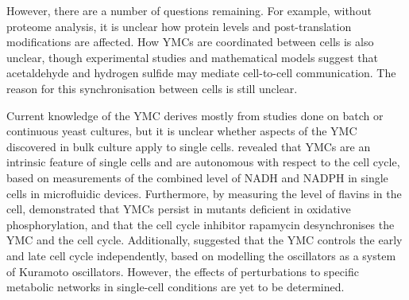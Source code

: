 However, there are a number of questions remaining.
For example, without proteome analysis, it is unclear how protein levels and post-translation modifications are affected.
How YMCs are coordinated between cells is also unclear, though experimental studies \citep{murrayRegulationYeastOscillatory2007} and mathematical models
\citep{krishnaMinimalPushPull2018} suggest that acetaldehyde and hydrogen sulfide may mediate cell-to-cell communication.
The reason for this synchronisation between cells is still unclear. %

Current knowledge of the YMC derives mostly from studies done on batch or continuous yeast cultures, but it is unclear whether aspects of the YMC discovered in bulk culture apply to single cells.
\citet{papagiannakisAutonomousMetabolicOscillations2017} revealed that YMCs are an intrinsic feature of single cells and are autonomous with respect to the cell cycle, based on measurements of the combined level of NADH and NADPH in single cells in microfluidic devices.
Furthermore, by measuring the level of flavins in the cell, \citet{baumgartnerFlavinbasedMetabolicCycles2018} demonstrated that YMCs persist in mutants deficient in oxidative phosphorylation, and that the cell cycle inhibitor rapamycin desynchronises the YMC and the cell cycle.
Additionally, \citet{ozsezenInferenceHighLevelInteraction2019} suggested that the YMC controls the early and late cell cycle independently, based on modelling the oscillators as a system of Kuramoto oscillators.
However, the effects of perturbations to specific metabolic networks in single-cell conditions are yet to be determined.



